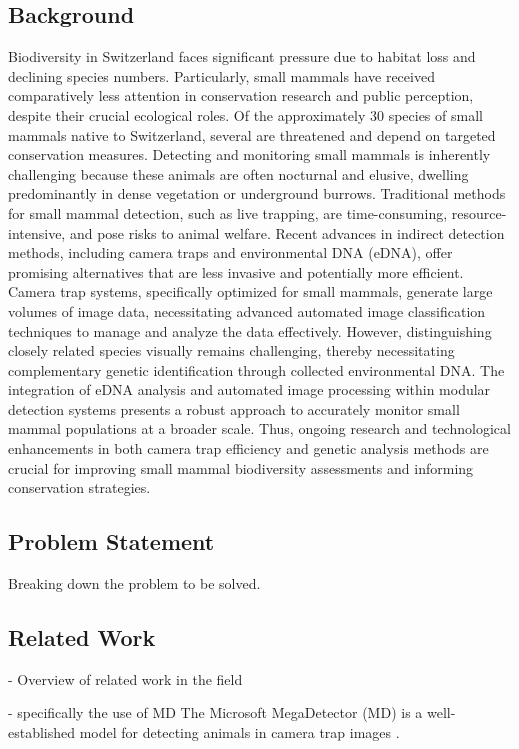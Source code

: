     \subsection{Background}
    Biodiversity in Switzerland faces significant pressure due to habitat loss and declining species numbers.
    Particularly, small mammals have received comparatively less attention in conservation research and public perception, despite their crucial ecological roles.
    Of the approximately 30 species of small mammals native to Switzerland, several are threatened and depend on targeted conservation measures.
    Detecting and monitoring small mammals is inherently challenging because these animals are often nocturnal and elusive, dwelling predominantly in dense vegetation or underground burrows.
    Traditional methods for small mammal detection, such as live trapping, are time-consuming, resource-intensive, and pose risks to animal welfare.
    Recent advances in indirect detection methods, including camera traps and environmental DNA (eDNA), offer promising alternatives that are less invasive and potentially more efficient.
    Camera trap systems, specifically optimized for small mammals, generate large volumes of image data, necessitating advanced automated image classification techniques to manage and analyze the data effectively.
    However, distinguishing closely related species visually remains challenging, thereby necessitating complementary genetic identification through collected environmental DNA.
    The integration of eDNA analysis and automated image processing within modular detection systems presents a robust approach to accurately monitor small mammal populations at a broader scale.
    Thus, ongoing research and technological enhancements in both camera trap efficiency and genetic analysis methods are crucial for improving small mammal biodiversity assessments and informing conservation strategies.

    \subsection{Problem Statement}

    Breaking down the problem to be solved.

    \subsection{Related Work}

    - Overview of related work in the field

    - specifically the use of MD
    The Microsoft MegaDetector (MD) is a well-established model for detecting animals in camera trap images \autocite{hernandezPytorchWildlifeCollaborativeDeep2024, velezChoosingAppropriatePlatform2022, schneiderRecognitionEuropeanMammals2024}.

